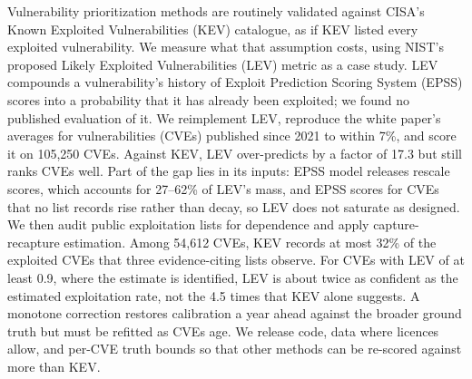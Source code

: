 Vulnerability prioritization methods are routinely validated against CISA's
Known Exploited Vulnerabilities (KEV) catalogue, as if KEV listed every
exploited vulnerability. We measure what that assumption costs, using NIST's
proposed Likely Exploited Vulnerabilities (LEV) metric as a case study. LEV
compounds a vulnerability's history of Exploit Prediction Scoring System
(EPSS) scores into a probability that it has already been exploited; we found
no published evaluation of it. We reimplement LEV, reproduce the
white paper's averages for vulnerabilities (CVEs) published since 2021 to
within 7\%, and score it on 105,250 CVEs. Against KEV, LEV over-predicts by a
factor of 17.3 but still ranks CVEs well. Part of the gap lies in its
inputs: EPSS model releases rescale scores, which accounts for
27--62\% of LEV's mass, and EPSS scores for CVEs that no list records rise
rather than decay, so LEV does not saturate as designed. We then audit public exploitation lists
for dependence and apply capture-recapture estimation. Among 54,612 CVEs,
KEV records at most 32\% of the exploited CVEs that three evidence-citing
lists observe. For CVEs with LEV of at least 0.9, where the estimate is
identified, LEV is about twice as confident as the estimated exploitation
rate, not the 4.5 times that KEV alone suggests. A monotone correction
restores calibration a year ahead against the broader ground truth but must be
refitted as CVEs age. We release code, data where licences allow, and
per-CVE truth bounds so that other methods can be re-scored against more than
KEV.
